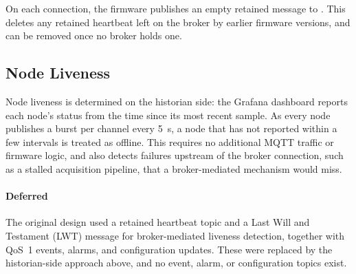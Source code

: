 On each connection, the firmware publishes an empty retained message to . This deletes any retained heartbeat left on the broker by earlier firmware versions, and can be removed once no broker holds one.

\subsection{Node Liveness}
Node liveness is determined on the historian side: the Grafana dashboard reports each node's status from the time since its most recent sample. As every node publishes a burst per channel every 5~s, a node that has not reported within a few intervals is treated as offline. This requires no additional MQTT traffic or firmware logic, and also detects failures upstream of the broker connection, such as a stalled acquisition pipeline, that a broker-mediated mechanism would miss.

\paragraph{Deferred} The original design used a retained heartbeat topic and a Last Will and Testament (LWT) message for broker-mediated liveness detection, together with QoS~1 events, alarms, and configuration updates. These were replaced by the historian-side approach above, and no event, alarm, or configuration topics exist.
